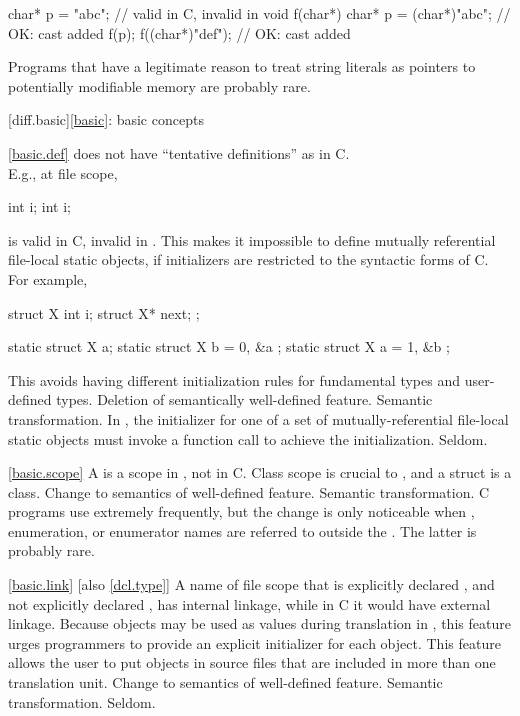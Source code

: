 \begin{codeblock}
char* p = "abc";                // valid in C, invalid in \Cpp
void f(char*) {
  char* p = (char*)"abc";       // OK: cast added
  f(p);
  f((char*)"def");              // OK: cast added
}
\end{codeblock}

\howwide
Programs that have a legitimate reason to treat string literals
as pointers to potentially modifiable memory are probably rare.

[diff.basic]{\ref{basic}: basic concepts}

\ref{basic.def}
\change \Cpp does not have ``tentative definitions'' as in C.\\
E.g., at file scope,

\begin{codeblock}
int i;
int i;
\end{codeblock}

is valid in C, invalid in \Cpp.
This makes it impossible to define
mutually referential file-local static objects, if initializers are
restricted to the syntactic forms of C\@.
For example,

\begin{codeblock}
struct X { int i; struct X* next; };

static struct X a;
static struct X b = { 0, &a };
static struct X a = { 1, &b };
\end{codeblock}

\rationale
This avoids having different initialization rules for
fundamental types and user-defined types.
\effect
Deletion of semantically well-defined feature.
\difficulty
Semantic transformation.
In \Cpp, the initializer for one of a set of
mutually-referential file-local static objects must invoke a function
call to achieve the initialization.
\howwide
Seldom.

\ref{basic.scope}
\change A  is a scope in \Cpp, not in C.
\rationale
Class scope is crucial to \Cpp, and a struct is a class.
\effect
Change to semantics of well-defined feature.
\difficulty
Semantic transformation.
\howwide
C programs use  extremely frequently, but the
change is only noticeable when , enumeration, or enumerator
names are referred to outside the .
The latter is probably rare.

\ref{basic.link} [also \ref{dcl.type}]
\change A name of file scope that is explicitly declared , and not explicitly
declared , has internal linkage, while in C it would have external linkage.
\rationale
Because  objects may be used as values during translation in
\Cpp, this feature urges programmers to provide an explicit initializer
for each  object.
This feature allows the user to put  objects in source files that are included
in more than one translation unit.
\effect
Change to semantics of well-defined feature.
\difficulty
Semantic transformation.
\howwide
Seldom.

